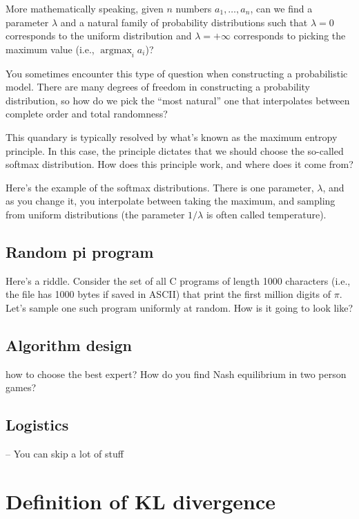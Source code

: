 \documentclass{article}
\newcommand{\argmax}{\operatorname{argmax}}
\begin{document}
More mathematically speaking, given \(n\) numbers \(a_1, \dots, a_n\), can we find a parameter \(\lambda\) and a natural family of probability distributions such that \(\lambda=0\) corresponds to the uniform distribution and \(\lambda=+\infty\) corresponds to picking the maximum value (i.e., \(\argmax_{i} a_i\))?

You sometimes encounter this type of question when constructing a probabilistic model. There are many degrees of freedom in constructing a probability distribution, so how do we pick the ``most natural'' one that interpolates between complete order and total randomness?

This quandary is typically resolved by what's known as the maximum entropy principle. In this case, the principle dictates that we should choose the so-called softmax distribution. How does this principle work, and where does it come from?

Here's the example of the softmax distributions. There is one parameter, $\lambda$, and as you change it, you interpolate between taking the maximum, and sampling from uniform distributions (the parameter $1/\lambda$ is often called temperature). 


\subsection{Random pi program}

Here's a riddle. Consider the set of all C programs of length 1000 characters (i.e., the file has 1000 bytes if saved in ASCII) that print the first million digits of $\pi$. Let's sample one such program uniformly at random. How is it going to look like? 

\subsection{Algorithm design}


how to choose the best expert? 
How do you find Nash equilibrium in two person games?

\subsection{Logistics}

-- You can skip a lot of stuff

\section{Definition of KL divergence}
\end{document}
